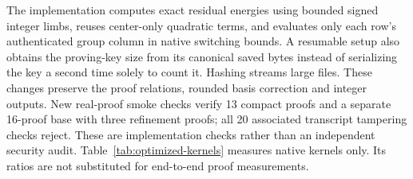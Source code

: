 The implementation computes exact residual energies using bounded signed
integer limbs, reuses center-only quadratic terms, and evaluates only each
row's authenticated group column in native switching bounds. A resumable
setup also obtains the proving-key size from its canonical saved bytes
instead of serializing the key a second time solely to count it. Hashing
streams large files. These changes preserve the proof relations, rounded
basis correction and integer outputs. New real-proof smoke checks verify
13 compact proofs and a separate 16-proof base with three refinement proofs;
all 20 associated transcript tampering checks reject. These are
implementation checks rather than an independent security audit.
Table~\ref{tab:optimized-kernels} measures native kernels only. Its ratios
are not substituted for end-to-end proof measurements.

